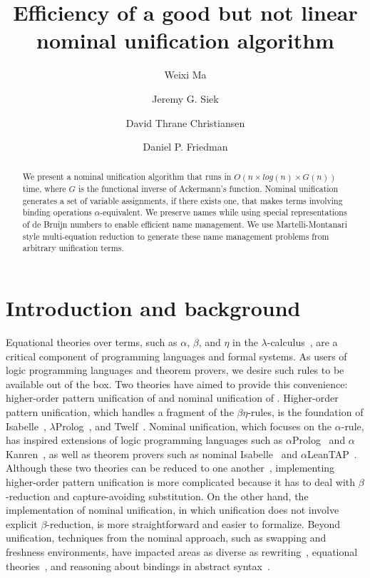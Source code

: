 \documentclass[a4paper,UKenglish]{lipics-v2016}
\title{Efficiency of a good but not linear nominal unification algorithm}
\author[1]{Weixi Ma}
\author[2]{Jeremy G. Siek}
\author[3]{David Thrane Christiansen}
\author[4]{Daniel P. Friedman}
\affil[1]{Indiana University,
  \texttt{mvc@iu.edu}}
\affil[2]{Indiana University,
  \texttt{jsiek@indiana.edu}}
\affil[3]{Galois, Inc.,
  \texttt{dtc@galois.com}}
\affil[4]{Indiana University,
  \texttt{dfried@indiana.edu}}
\begin{document}
\maketitle

\begin{abstract}
  We present a nominal unification algorithm that runs in $O(n \times
  log(n) \times G(n))$ time, where $G$ is the functional inverse of
  Ackermann's function.  Nominal unification generates a set of
  variable assignments, if there exists one, that makes terms
  involving binding operations $\alpha$-equivalent. We preserve names
  while using special representations of de Bruijn numbers
  to enable efficient name management.
  We use Martelli-Montanari style multi-equation reduction
  to generate these name management problems from arbitrary unification terms.
\end{abstract}

\section{Introduction and background}

Equational theories over terms, such as $\alpha$, $\beta$, and $\eta$
in the $\lambda$-calculus~\citep{church_calculi_1941}, are a critical
component of programming languages and formal systems.  As users of
logic programming languages and theorem provers, we desire such rules
to be available out of the box.  Two theories have aimed to
provide this convenience: higher-order pattern unification of
\citet{miller_logic_1989} and nominal unification of
\citet{urban_nominal_2004}. Higher-order pattern unification, which
handles a fragment of the $\beta\eta$-rules, is the foundation of
Isabelle~\citep{paulson_natural_1986},
$\lambda$Prolog~\citep{nadathur_overview_1988}, and
Twelf~\citep{pfenning_system_1999}.  Nominal unification, which
focuses on the $\alpha$-rule, has inspired extensions of logic
programming languages such as $\alpha$Prolog~\citep{cheney_prolog:_2004}
and $\alpha$Kanren~\citep{byrd_kanren_2007}, as well as theorem
provers such as nominal Isabelle~\citep{urban_nominal_2005} and
$\alpha$LeanTAP~\citep{near_leantap:_2008}. Although these two
theories can be reduced to one another~\citep{cheney_relating_2005,
  levy_nominal_2012}, implementing higher-order pattern unification is
more complicated because it has to deal with $\beta$-reduction and
capture-avoiding substitution.  On the other hand, the implementation of
nominal unification, in which unification does not involve explicit $\beta$-reduction,
is more straightforward and easier to formalize.  Beyond unification,
techniques from the nominal approach, such as swapping and freshness
environments, have impacted areas as diverse as
rewriting~\citep{fernandez_nominal_2004, fernandez_nominal_2005,
  fernandez_nominal_2007, aoto_nominal_2016}, equational
theories~\citep{ayala-rincon_nominal_2016}, and reasoning about
bindings in abstract syntax~\citep{pitts_metalanguage_2000,
  gabbay_new_2002}.
\end{document}
